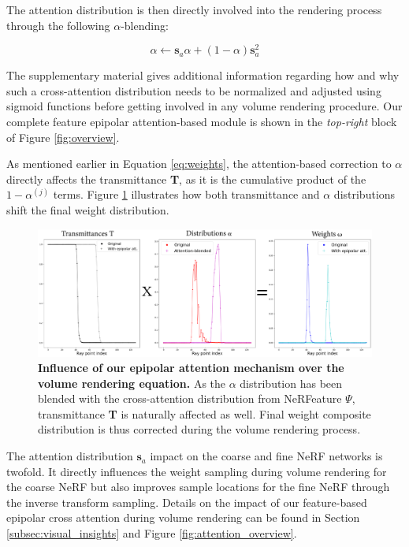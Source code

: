 The attention distribution is then directly involved into the rendering process through the following $\alpha$-blending: 

\begin{equation}
\label{eq:alpha}
\alpha  \gets \textbf{s}_{a}\alpha + (1-\alpha)\textbf{s}_{a}^{2}
\end{equation}

The supplementary material gives additional information regarding how and why such a cross-attention distribution needs to be normalized and adjusted using sigmoid functions before getting involved in any volume rendering procedure. Our complete feature epipolar attention-based module is shown in the \textit{top-right} block of Figure \ref{fig:overview}. 

As mentioned earlier in Equation \eqref{eq:weights}, the attention-based correction to $\alpha$ directly affects the transmittance \textbf{T}, as it is the cumulative product of the $1 - \alpha^{(j)}$ terms.  Figure \ref{fig:overall_attention} illustrates how both transmittance and $\alpha$ distributions shift the final weight distribution. 

\begin{figure}[h!]
    \begin{center}
  \includegraphics[width=\linewidth]{images/epinerf/SUPP_VR_OVERLEAF.png}
  \caption{\textbf{Influence of our epipolar attention mechanism over the volume rendering equation.} As the $\alpha$ distribution has been blended with the cross-attention distribution from NeRFeature $\Psi$, transmittance \textbf{T} is naturally affected as well. Final weight composite distribution is thus corrected during the volume rendering process.} 
  \label{fig:overall_attention}
  \end{center}
\end{figure}

The attention distribution $\textbf{s}_{a}$ impact on the coarse and fine NeRF networks is twofold. It directly influences the weight sampling during volume rendering for the coarse NeRF but also improves sample locations for the fine NeRF through the inverse transform sampling. Details on the impact of our feature-based epipolar cross attention during volume rendering can be found in Section \ref{subsec:visual_insights} and Figure \ref{fig:attention_overview}.  

